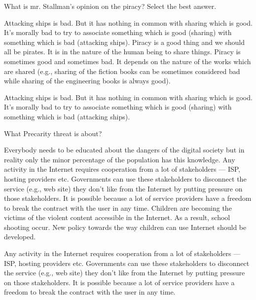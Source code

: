 \begin{question}[type=exam]
What is mr. Stallman's opinion on the piracy? Select the best answer.
\begin{itemize}
\chk Attacking ships is bad. But it has nothing in common with sharing which is good. It's morally bad to try to associate something which is good (sharing) with something which is bad (attacking ships).
\chk Piracy is a good thing and we should all be pirates. It is in the nature of the human being to share things.
\chk Piracy is sometimes good and sometimes bad. It depends on the nature of the works which are shared (e.g., sharing of the fiction books can be sometimes considered bad while sharing of the engineering books is always good).
\end{itemize}
\end{question}
\begin{solution}
Attacking ships is bad. But it has nothing in common with sharing which is good. It's morally bad to try to associate something which is good (sharing) with something which is bad (attacking ships).
\end{solution}

\begin{question}[type=exam]
What Precarity threat is about?
\begin{itemize}
\chk Everybody needs to be educated about the dangers of the digital society but in reality only the minor percentage of the population has this knowledge.
\chk Any activity in the Internet requires cooperation from a lot of stakeholders --- ISP, hosting providers etc. Governments can use these stakeholders to disconnect the service (e.g., web site) they don't like from the Internet by putting pressure on those stakeholders. It is possible because a lot of service providers have a freedom to break the contract with the user in any time.
\chk Children are becoming the victims of the violent content accessible in the Internet. As a result, school shooting occur. New policy towards the way children can use Internet should be developed.
\end{itemize}
\end{question}
\begin{solution}
Any activity in the Internet requires cooperation from a lot of stakeholders --- ISP, hosting providers etc. Governments can use these stakeholders to disconnect the service (e.g., web site) they don't like from the Internet by putting pressure on those stakeholders. It is possible because a lot of service providers have a freedom to break the contract with the user in any time.
\end{solution}

